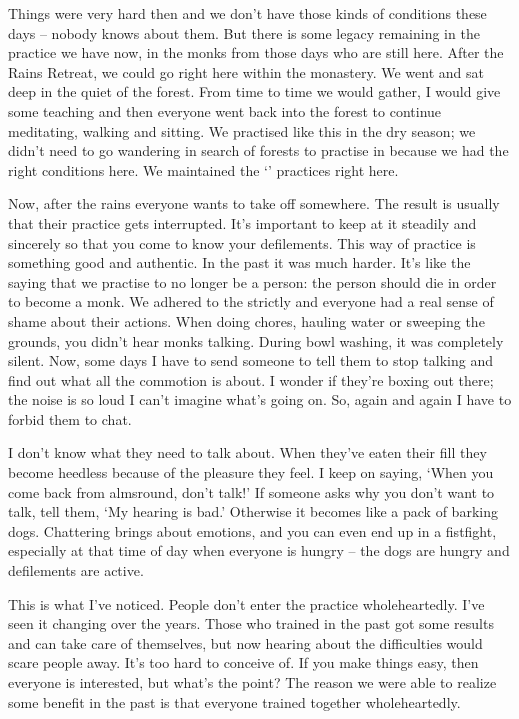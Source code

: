 Things were very hard then and we don't have those kinds of conditions these days -- nobody knows about them. But there is some legacy remaining in the practice we have now, in the monks from those days who are still here. After the Rains Retreat, we could go  right here within the monastery. We went and sat deep in the quiet of the forest. From time to time we would gather, I would give some teaching and then everyone went back into the forest to continue meditating, walking and sitting. We practised like this in the dry season; we didn't need to go wandering in search of forests to practise in because we had the right conditions here. We maintained the `' practices right here. 

Now, after the rains everyone wants to take off somewhere. The result is usually that their practice gets interrupted. It's important to keep at it steadily and sincerely so that you come to know your defilements. This way of practice is something good and authentic. In the past it was much harder. It's like the saying that we practise to no longer be a person: the person should die in order to become a monk. We adhered to the  strictly and everyone had a real sense of shame about their actions. When doing chores, hauling water or sweeping the grounds, you didn't hear monks talking. During bowl washing, it was completely silent. Now, some days I have to send someone to tell them to stop talking and find out what all the commotion is about. I wonder if they're boxing out there; the noise is so loud I can't imagine what's going on. So, again and again I have to forbid them to chat. 

I don't know what they need to talk about. When they've eaten their fill they become heedless because of the pleasure they feel. I keep on saying, `When you come back from almsround, don't talk!' If someone asks why you don't want to talk, tell them, `My hearing is bad.' Otherwise it becomes like a pack of barking dogs. Chattering brings about emotions, and you can even end up in a fistfight, especially at that time of day when everyone is hungry -- the dogs are hungry and defilements are active. 

This is what I've noticed. People don't enter the practice wholeheartedly. I've seen it changing over the years. Those who trained in the past got some results and can take care of themselves, but now hearing about the difficulties would scare people away. It's too hard to conceive of. If you make things easy, then everyone is interested, but what's the point? The reason we were able to realize some benefit in the past is that everyone trained together wholeheartedly. 

